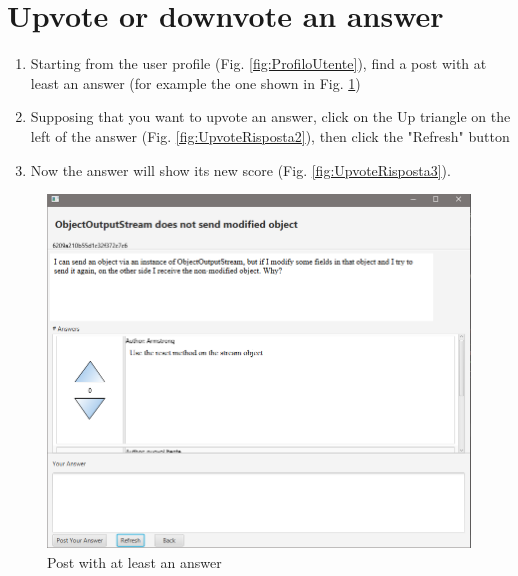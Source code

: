 \documentclass[11pt]{report}
\begin{document}
\section{Upvote or downvote an answer}
\begin{enumerate}
    \item Starting from the user profile (Fig. \ref{fig:ProfiloUtente}), find a post with at least an answer (for example the one shown in Fig. \ref{fig:UpvoteRisposta1})
    \item Supposing that you want to upvote an answer, click on the Up triangle on the left of the answer (Fig. \ref{fig:UpvoteRisposta2}), then click the "Refresh" button
    \item Now the answer will show its new score (Fig. \ref{fig:UpvoteRisposta3}).
\end{enumerate}
\begin{figure}[H]
  \centering
  \includegraphics[width=\textwidth,keepaspectratio=true]{img/user_manual/UpvoteRisposta1.png}
  \caption{Post with at least an answer}
  \label{fig:UpvoteRisposta1}
\end{figure}
\end{document}
